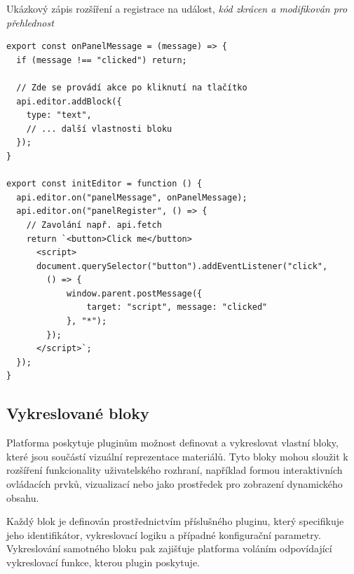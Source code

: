 \begin{listing}[ht!]
\caption[Ukázkový zápis rozšíření a registrace na událost]{Ukázkový zápis rozšíření a registrace na událost, \textit{kód zkrácen a modifikován pro přehlednost}}\label{code:registraceUdalosti}
\begin{verbatim}
export const onPanelMessage = (message) => {
  if (message !== "clicked") return;

  // Zde se provádí akce po kliknutí na tlačítko
  api.editor.addBlock({
    type: "text",
    // ... další vlastnosti bloku
  });
}

export const initEditor = function () {
  api.editor.on("panelMessage", onPanelMessage);
  api.editor.on("panelRegister", () => {
    // Zavolání např. api.fetch
    return `<button>Click me</button>
      <script>
      document.querySelector("button").addEventListener("click", 
        () => {
            window.parent.postMessage({
                target: "script", message: "clicked"
            }, "*");
        });
      </script>`;
  });
}
\end{verbatim}
\end{listing}


\subsection{Vykreslované bloky}


Platforma poskytuje pluginům možnost definovat a vykreslovat vlastní bloky, které jsou součástí vizuální reprezentace materiálů.
Tyto bloky mohou sloužit k rozšíření funkcionality uživatelského rozhraní, například formou interaktivních ovládacích prvků, vizualizací nebo jako prostředek pro zobrazení dynamického obsahu.

Každý blok je definován prostřednictvím příslušného pluginu, který specifikuje jeho identifikátor, vykreslovací logiku a případné konfigurační parametry. 
Vykreslování samotného bloku pak zajišťuje platforma voláním odpovídající vykreslovací funkce, kterou plugin poskytuje. 

